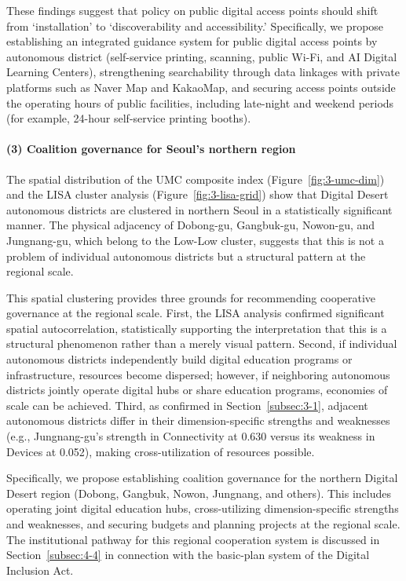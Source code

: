 These findings suggest that policy on public digital access points should shift from `installation' to `discoverability and accessibility.' Specifically, we propose establishing an integrated guidance system for public digital access points by autonomous district (self-service printing, scanning, public Wi-Fi, and AI Digital Learning Centers), strengthening searchability through data linkages with private platforms such as Naver Map and KakaoMap, and securing access points outside the operating hours of public facilities, including late-night and weekend periods (for example, 24-hour self-service printing booths).

\paragraph{(3) Coalition governance for Seoul's northern region}

The spatial distribution of the UMC composite index (Figure~\ref{fig:3-umc-dim}) and the LISA cluster analysis (Figure~\ref{fig:3-lisa-grid}) show that Digital Desert autonomous districts are clustered in northern Seoul in a statistically significant manner. The physical adjacency of Dobong-gu, Gangbuk-gu, Nowon-gu, and Jungnang-gu, which belong to the Low-Low cluster, suggests that this is not a problem of individual autonomous districts but a structural pattern at the regional scale.

This spatial clustering provides three grounds for recommending cooperative governance at the regional scale. First, the LISA analysis confirmed significant spatial autocorrelation, statistically supporting the interpretation that this is a structural phenomenon rather than a merely visual pattern. Second, if individual autonomous districts independently build digital education programs or infrastructure, resources become dispersed; however, if neighboring autonomous districts jointly operate digital hubs or share education programs, economies of scale can be achieved. Third, as confirmed in Section~\ref{subsec:3-1}, adjacent autonomous districts differ in their dimension-specific strengths and weaknesses (e.g., Jungnang-gu's strength in Connectivity at 0.630 versus its weakness in Devices at 0.052), making cross-utilization of resources possible.

Specifically, we propose establishing coalition governance for the northern Digital Desert region (Dobong, Gangbuk, Nowon, Jungnang, and others). This includes operating joint digital education hubs, cross-utilizing dimension-specific strengths and weaknesses, and securing budgets and planning projects at the regional scale. The institutional pathway for this regional cooperation system is discussed in Section~\ref{subsec:4-4} in connection with the basic-plan system of the Digital Inclusion Act.

